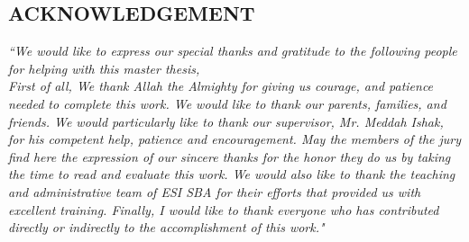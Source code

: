 \begin{center}
\section*{ACKNOWLEDGEMENT}
\vspace{4cm}
\LARGE
\emph{``We would like to express our special thanks and gratitude to the following people for helping with this master thesis,}\\
\vspace{1cm}
\emph{First of all, We thank Allah the Almighty for giving us courage, and patience needed to complete this work. We would like to thank our parents, families, and friends. We would particularly like to thank our supervisor, Mr. Meddah Ishak, for his competent help, patience and encouragement. May the members of the jury find here the expression of our sincere thanks for the honor they do us by taking the time to read and evaluate this work. We would also like to thank the teaching and administrative team of ESI SBA for their efforts that provided us with excellent training. Finally, I would like to thank everyone who has contributed directly or indirectly to the accomplishment of this work."}
\normalsize
\end{center}